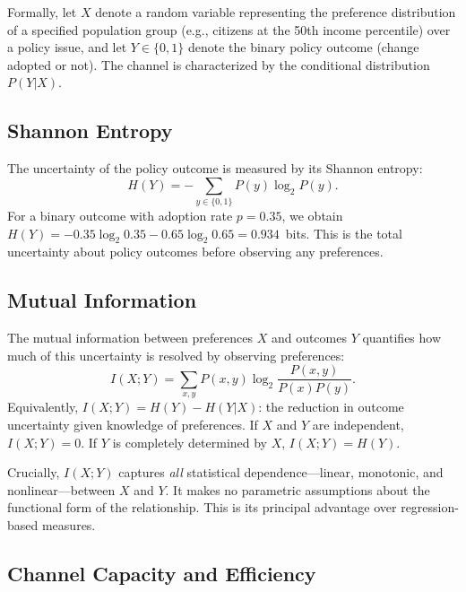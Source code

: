 \documentclass[twocolumn,10pt]{article}
\begin{document}
Formally, let $X$ denote a random variable representing the preference distribution of a specified population group (e.g., citizens at the 50th income percentile) over a policy issue, and let $Y \in \{0, 1\}$ denote the binary policy outcome (change adopted or not).  The channel is characterized by the conditional distribution $P(Y|X)$.

\subsection{Shannon Entropy}

The uncertainty of the policy outcome is measured by its Shannon entropy:
\begin{equation}
H(Y) = -\sum_{y \in \{0,1\}} P(y) \log_2 P(y).
\label{eq:entropy}
\end{equation}
For a binary outcome with adoption rate $p = 0.35$, we obtain $H(Y) = -0.35\log_2 0.35 - 0.65\log_2 0.65 = 0.934$~bits.  This is the total uncertainty about policy outcomes before observing any preferences.

\subsection{Mutual Information}

The mutual information between preferences $X$ and outcomes $Y$ quantifies how much of this uncertainty is resolved by observing preferences:
\begin{equation}
I(X;Y) = \sum_{x,y} P(x,y) \log_2 \frac{P(x,y)}{P(x)P(y)}.
\label{eq:mi}
\end{equation}
Equivalently, $I(X;Y) = H(Y) - H(Y|X)$: the reduction in outcome uncertainty given knowledge of preferences.  If $X$ and $Y$ are independent, $I(X;Y) = 0$.  If $Y$ is completely determined by $X$, $I(X;Y) = H(Y)$.

Crucially, $I(X;Y)$ captures \emph{all} statistical dependence---linear, monotonic, and nonlinear---between $X$ and $Y$.  It makes no parametric assumptions about the functional form of the relationship.  This is its principal advantage over regression-based measures.

\subsection{Channel Capacity and Efficiency}
\end{document}
